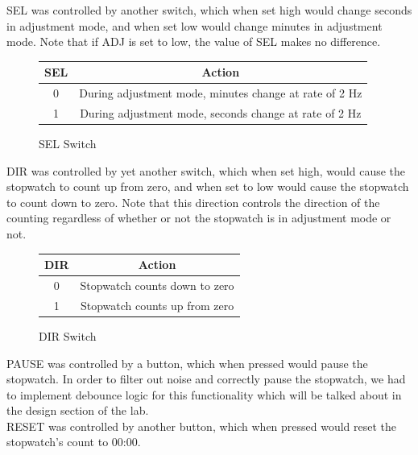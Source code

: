 \documentclass{article}
\begin{document}
SEL was controlled by another switch, which when set high would change seconds in adjustment mode, and when set low would change minutes in adjustment mode.  Note that if ADJ is set to low, the value of SEL makes no difference.\\

\begin{figure}[H]
\begin{center}
\begin{tabular}{ | c | c | }

\hline
\textbf{SEL} & \textbf{Action} \\ 
\hline
0 & During adjustment mode, minutes change at rate of 2 Hz\\
\hline
1 & During adjustment mode, seconds change at rate of 2 Hz\\
\hline

\end{tabular}
\caption{SEL Switch}
\end{center}
\end{figure}

DIR was controlled by yet another switch, which when set high, would cause the stopwatch to count up from zero, and when set to low would cause the stopwatch to count down to zero.  Note that this direction controls the direction of the counting regardless of whether or not the stopwatch is in adjustment mode or not. \\

\begin{figure}[H]
\begin{center}
\begin{tabular}{ | c | c | }

\hline
\textbf{DIR} & \textbf{Action} \\ 
\hline
0 & Stopwatch counts down to zero\\
\hline
1 & Stopwatch counts up from zero\\
\hline

\end{tabular}
\caption{DIR Switch}
\end{center}
\end{figure}

PAUSE was controlled by a button, which when pressed would pause the stopwatch.  In order to filter out noise and correctly pause the stopwatch, we had to implement debounce logic for this functionality which will be talked about in the design section of the lab.\\

RESET was controlled by another button, which when pressed would reset the stopwatch's count to 00:00.\\
\end{document}
